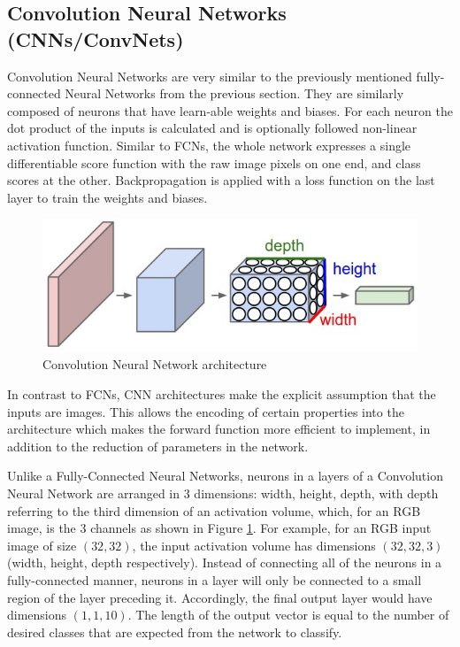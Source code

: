 \subsection{Convolution Neural Networks (CNNs/ConvNets)}
Convolution Neural Networks are very similar to the previously mentioned fully-connected Neural Networks from the previous section. They are similarly composed of neurons that have learn-able weights and biases. For each neuron the dot product of the inputs is calculated and is optionally followed non-linear activation function. Similar to FCNs, the whole network expresses a single differentiable score function with the raw image pixels on one end, and class scores at the other. Backpropagation is applied with a loss function on the last layer to train the weights and biases.

\begin{figure}[ht]
\includegraphics[trim={0cm 0cm 0cm 0cm},clip,width=\linewidth]{Figures/cnn.jpeg}
\centering
\caption{Convolution Neural Network architecture}
\label{cnn}
\end{figure}

In contrast to FCNs, CNN architectures make the explicit assumption that the inputs are images. This allows the encoding of certain properties into the architecture which makes the forward function more efficient to implement, in addition to the reduction of parameters in the network.

Unlike a Fully-Connected Neural Networks, neurons in a layers of a Convolution Neural Network are arranged in 3 dimensions: width, height, depth, with depth referring to the third dimension of an activation volume, which, for an RGB image, is the 3 channels as shown in Figure \ref{cnn}. For example, for an RGB input image of size \((32,32)\), the input activation volume has dimensions \((32,32,3)\) (width, height, depth respectively). Instead of connecting all of the neurons in a fully-connected manner, neurons in a layer will only be connected to a small region of the layer preceding it. Accordingly, the final output layer would have dimensions \((1,1,10)\). The length of the output vector is equal to the number of desired classes that are expected from the network to classify.

